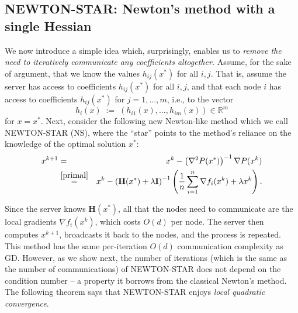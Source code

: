 \documentclass[12pt]{article}
\newcommand{\eqdef}{\; { := }\;}
\newcommand{\R}{\mathbb{R}}
\newcommand{\newalpha}{h}
\newcommand{\mH}{\mathbf{H}}
\newcommand{\mI}{\mathbf{I}}
\begin{document}
\subsection{{\sf NEWTON-STAR}: Newton's method with a single Hessian} \label{subsec:Newton-star}

We now introduce a simple idea which, surprisingly, enables us to {\em remove the need to iteratively communicate any coefficients altogether.}  Assume, for the sake of argument, that we know the values  $\newalpha_{ij}(x^*)$ for all $i,j$. That is, assume the server has access to coefficients $\newalpha_{ij}(x^*)$ for all $i,j$, and that each node $i$ has access to coefficients $\newalpha_{ij}(x^*)$  for $j=1,\dots,m$, i.e., to the vector
\begin{equation}\label{eq:8f0d8hfd}\newalpha_{i}(x) \eqdef (\newalpha_{i1}(x),\dots, \newalpha_{im}(x)) \in \R^m\end{equation}
for $x=x^*$.  Next, consider the following new Newton-like method which we call {\sf NEWTON-STAR (NS)}, where the ``star'' points to the method's reliance on the knowledge of the optimal solution $x^*$:
\begin{eqnarray}  x^{k+1} &=& x^k - \left(\nabla^2 P(x^*) \right)^{-1} \nabla P(x^k)\notag\\ 
&\overset{\eqref{primal}}{=}& x^k - \left(\mH(x^*) +\lambda \mI \right)^{-1} \left(\frac{1}{n}\sum_{i=1}^n \nabla f_i(x^k) + \lambda x^k\right).\label{eq:Newton-star}\end{eqnarray}

Since the server knows $\mH(x^*)$, all that the nodes need to communicate are the local gradients $\nabla f_i(x^k)$, which costs $O(d)$ per node. The server then computes $x^{k+1}$, broadcasts it back to the nodes, and the process is repeated. This method has the same per-iteration $O(d)$ communication complexity as GD. However, as we show next, the number of iterations (which is the same as the number of communications) of {\sf NEWTON-STAR} does not depend on the condition number -- a property it borrows from the classical Newton's method. The following theorem says that {\sf NEWTON-STAR} enjoys {\em local quadratic convergence}.
\end{document}
